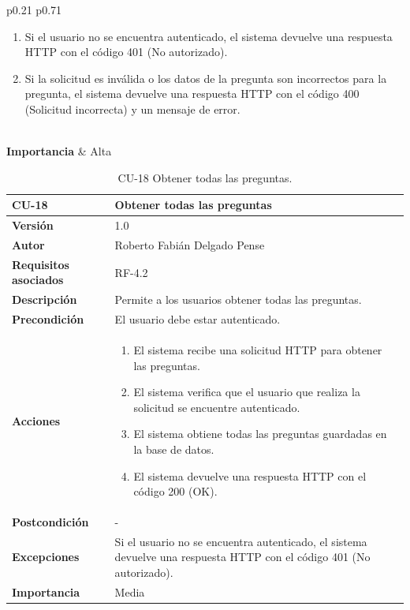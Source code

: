 \begin{table}[p]
\begin{tabularx}{\linewidth}{ p{0.21\columnwidth} p{0.71\columnwidth} }
\begin{enumerate}
			\tightlist
			\item Si el usuario no se encuentra autenticado, el sistema devuelve una respuesta HTTP con el código            401 (No autorizado).
			\item Si la solicitud es inválida o los datos de la pregunta son incorrectos para la pregunta, el sistema devuelve una respuesta HTTP con el código 400 (Solicitud incorrecta) y un mensaje de error.
            \end{enumerate}\\
		\textbf{Importancia}          & Alta \\
		\bottomrule
	\end{tabularx}
	\caption{CU-17 Crear pregunta.}
\end{table}

\begin{table}[p]
	\centering
	\begin{tabularx}{\linewidth}{ p{} p{} }
		\toprule
		\textbf{CU-18}    & \textbf{Obtener todas las preguntas}\\
		\toprule
		\textbf{Versión}              & 1.0    \\
		\textbf{Autor}                & Roberto Fabián Delgado Pense \\
		\textbf{Requisitos asociados} & RF-4.2 \\ 
		\textbf{Descripción}          & Permite a los usuarios obtener todas las  preguntas. \\
		\textbf{Precondición}         & El usuario debe estar autenticado.\\
		\textbf{Acciones}             &
		\begin{enumerate}
			\def\labelenumi{\arabic{enumi}.}
			\tightlist
			\item El sistema recibe una solicitud HTTP para obtener las preguntas.
                \item El sistema verifica que el usuario que realiza la solicitud se encuentre autenticado.
			\item El sistema obtiene todas las preguntas guardadas en la base de datos.
                \item El sistema devuelve una respuesta HTTP con el código 200 (OK).          
            \end{enumerate}\\
		\textbf{Postcondición}        & - \\
		\textbf{Excepciones}          & Si el usuario no se encuentra autenticado, el sistema devuelve una respuesta HTTP con el código 401 (No autorizado). \\
		\textbf{Importancia}          & Media \\
		\bottomrule
	\end{tabularx}
	\caption{CU-18 Obtener todas las preguntas.}
\end{table}

